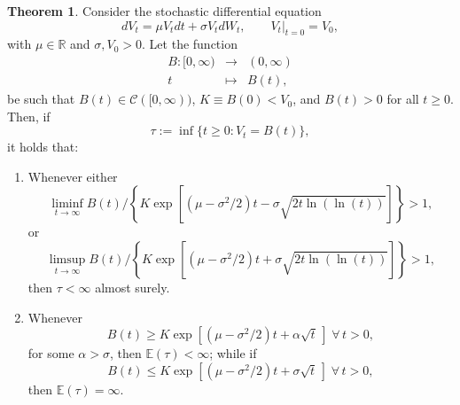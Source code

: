 \documentclass[12pt]{article}
\theoremstyle{definition}
\newtheorem{theorem}{Theorem}
\begin{document}
\begin{theorem}\label{mainfpt}
Consider the stochastic differential equation
$$
dV_t=\mu V_t dt + \sigma V_t dW_t, \qquad \left. V_t \right|_{t=0}= V_0,
$$
with $\mu \in \mathbb{R}$ and $\sigma, V_0>0$. Let the function
\begin{eqnarray}\nonumber
B:[0,\infty) &\longrightarrow& (0,\infty) \\ \nonumber
t &\longmapsto& B(t),
\end{eqnarray}
be such that $B(t) \in \mathcal{C}([0,\infty))$, $K \equiv B(0) < V_0$, and $B(t)>0$ for all $t \ge 0$. Then, if
$$
\tau := \inf \{t \ge 0 : V_t = B(t)\},
$$
it holds that:
\begin{enumerate}
\item[(a)] Whenever either
$$
\liminf_{t \to \infty} B(t) \Big/ \left\{ K \exp \left[(\mu-\sigma^2/2)t - \sigma \sqrt{2t \ln(\ln(t))}\right] \right\} >1,
$$
or
$$
\limsup_{t \to \infty} B(t) \Big/ \left\{ K \exp \left[(\mu-\sigma^2/2)t + \sigma \sqrt{2t \ln(\ln(t))}\right] \right\} >1,
$$
then $\tau < \infty$ almost surely.
\item[(b)] Whenever
$$
B(t) \ge K \exp \left[(\mu-\sigma^2/2)t + \alpha \sqrt{t} \, \right]\;\forall \, t > 0,
$$
for some $\alpha > \sigma$, then $\mathbb{E}(\tau)<\infty$; while if
$$
B(t) \le K \exp \left[(\mu-\sigma^2/2)t + \sigma \sqrt{t} \, \right]\;\forall \, t > 0, 
$$
then $\mathbb{E}(\tau)=\infty$.
\end{enumerate}
\end{theorem}
\end{document}
